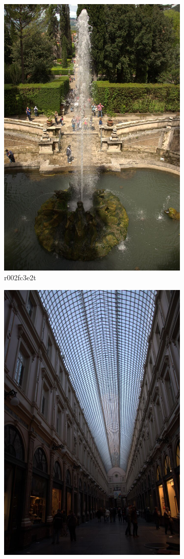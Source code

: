 \documentclass{ipol}
\begin{document}
\begin{figure}[ht]
    \centering
    \begin{subfigure}[c]{.31\linewidth}\centering
    \includegraphics[height=\linewidth]{images/original/r002fc3e2t.jpeg}
    \caption{r002fc3e2t}
    \end{subfigure}\hfill%
    \begin{subfigure}[c]{.31\linewidth}\centering
    \includegraphics[height=\linewidth]{images/original/r1ead3024t.jpeg}

\end{subfigure}
\end{figure}
\end{document}
